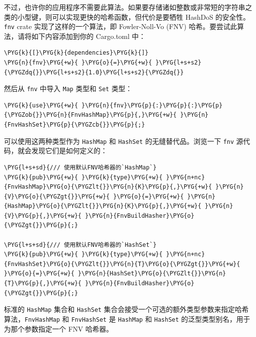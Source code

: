 不过，也许你的应用程序不需要此算法。如果要存储诸如整数或非常短的字符串之类的小型键，则可以实现更快的哈希函数，但代价是要牺牲 HashDoS 的安全性。\texttt{fnv} crate 实现了这样的一个算法，即 Fowler-Noll-Vo (FNV) 哈希。要尝试此算法，请将如下内容添加到你的 Cargo.toml 中：

\begin{Verbatim}[commandchars=\\\{\},breaklines=true,breakanywhere=true,fontsize=\codefont,xleftmargin=17bp]
\PYG{k}{[}\PYG{k}{dependencies}\PYG{k}{]}
\PYG{n}{fnv}\PYG{+w}{ }\PYG{o}{=}\PYG{+w}{ }\PYG{l+s+s2}{\PYGZdq{}}\PYG{l+s+s2}{1.0}\PYG{l+s+s2}{\PYGZdq{}}
\end{Verbatim}

然后从 \texttt{fnv} 中导入 \texttt{Map} 类型和 \texttt{Set} 类型：

\begin{Verbatim}[commandchars=\\\{\},breaklines=true,breakanywhere=true,fontsize=\codefont,xleftmargin=17bp]
\PYG{k}{use}\PYG{+w}{ }\PYG{n}{fnv}\PYG{p}{:}\PYG{p}{:}\PYG{p}{\PYGZob{}}\PYG{n}{FnvHashMap}\PYG{p}{,}\PYG{+w}{ }\PYG{n}{FnvHashSet}\PYG{p}{\PYGZcb{}}\PYG{p}{;}
\end{Verbatim}

可以使用这两种类型作为 \texttt{HashMap} 和 \texttt{HashSet} 的无缝替代品。浏览一下 \texttt{fnv} 源代码，就会发现它们是如何定义的：

\begin{Verbatim}[commandchars=\\\{\},breaklines=true,breakanywhere=true,fontsize=\codefont,xleftmargin=17bp]
\PYG{l+s+sd}{/// 使用默认FNV哈希器的`HashMap`}
\PYG{k}{pub}\PYG{+w}{ }\PYG{k}{type}\PYG{+w}{ }\PYG{n+nc}{FnvHashMap}\PYG{o}{\PYGZlt{}}\PYG{n}{K}\PYG{p}{,}\PYG{+w}{ }\PYG{n}{V}\PYG{o}{\PYGZgt{}}\PYG{+w}{ }\PYG{o}{=}\PYG{+w}{ }\PYG{n}{HashMap}\PYG{o}{\PYGZlt{}}\PYG{n}{K}\PYG{p}{,}\PYG{+w}{ }\PYG{n}{V}\PYG{p}{,}\PYG{+w}{ }\PYG{n}{FnvBuildHasher}\PYG{o}{\PYGZgt{}}\PYG{p}{;}

\PYG{l+s+sd}{/// 使用默认FNV哈希器的`HashSet`}
\PYG{k}{pub}\PYG{+w}{ }\PYG{k}{type}\PYG{+w}{ }\PYG{n+nc}{FnvHashSet}\PYG{o}{\PYGZlt{}}\PYG{n}{T}\PYG{o}{\PYGZgt{}}\PYG{+w}{ }\PYG{o}{=}\PYG{+w}{ }\PYG{n}{HashSet}\PYG{o}{\PYGZlt{}}\PYG{n}{T}\PYG{p}{,}\PYG{+w}{ }\PYG{n}{FnvBuildHasher}\PYG{o}{\PYGZgt{}}\PYG{p}{;}
\end{Verbatim}

标准的 \texttt{HashMap} 集合和 \texttt{HashSet} 集合会接受一个可选的额外类型参数来指定哈希算法，\texttt{FnvHashMap} 和 \texttt{FnvHashSet} 是 \texttt{HashMap} 和 \texttt{HashSet} 的泛型类型别名，用于为那个参数指定一个 FNV 哈希器。

